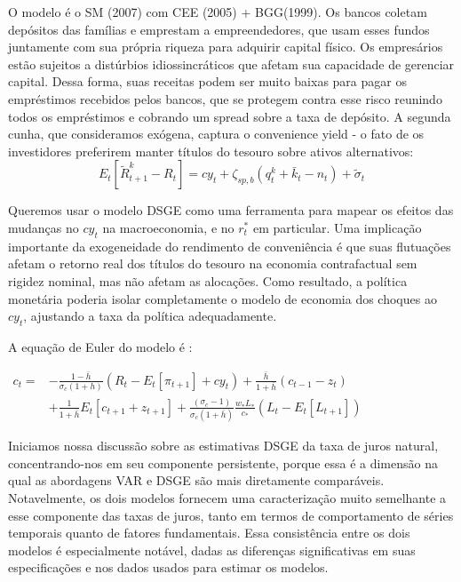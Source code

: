 O modelo é o SM (2007) com CEE (2005) + BGG(1999). Os bancos coletam depósitos das famílias e emprestam a empreendedores, que usam esses fundos juntamente com sua própria riqueza para adquirir capital físico. Os empresários estão sujeitos a distúrbios idiossincráticos que afetam sua capacidade de gerenciar capital. Dessa forma, suas receitas podem ser muito baixas para pagar os empréstimos recebidos pelos bancos, que se protegem contra esse risco reunindo todos os empréstimos e cobrando um spread sobre a taxa de depósito. A segunda cunha, que consideramos exógena, captura o convenience yield - o fato de os investidores preferirem manter títulos do tesouro sobre ativos alternativos:
$$E_t\left[ \tilde{R}_{t+1}^{k} - R_t \right] = cy_t +  \zeta_{sp,b} \left(q_t^{k} + \bar{k}_t - n_t \right) + \tilde{\sigma}_t$$

Queremos usar o modelo DSGE como uma ferramenta para mapear os efeitos das mudanças no $cy_t$ na macroeconomia, e no $r_{t}^{*}$ em particular. Uma implicação importante da exogeneidade do rendimento de conveniência é que suas flutuações afetam o retorno real dos títulos do tesouro na economia contrafactual sem rigidez nominal, mas não afetam as alocações. Como resultado, a política monetária poderia isolar completamente o modelo de economia dos choques ao $cy_t$, ajustando a taxa da política adequadamente.

A equação de Euler do modelo é :

$\begin{aligned} c_{t}=&-\frac{1-\bar{h}}{\sigma_{c}(1+h)}\left(R_{t}-E_{t}\left[\pi_{t+1}\right]+c y_{t}\right)+\frac{\bar{h}}{1+\bar{h}}\left(c_{t-1}-z_{t}\right) \\ &+\frac{1}{1+\bar{h}} E_{t}\left[c_{t+1}+z_{t+1}\right]+\frac{\left(\sigma_{c}-1\right)}{\sigma_{c}(1+\bar{h})} \frac{w_{*} L_{*}}{c_{*}}\left(L_{t}-E_{t}\left[L_{t+1}\right]\right) \end{aligned}$

Iniciamos nossa discussão sobre as estimativas DSGE da taxa de juros natural, concentrando-nos em seu componente persistente, porque essa é a dimensão na qual as abordagens VAR e DSGE são mais diretamente comparáveis. Notavelmente, os dois modelos fornecem uma caracterização muito semelhante a esse componente das taxas de juros, tanto em termos de comportamento de séries temporais quanto de fatores fundamentais. Essa consistência entre os dois modelos é especialmente notável, dadas as diferenças significativas em suas especificações e nos dados usados para estimar os modelos.

